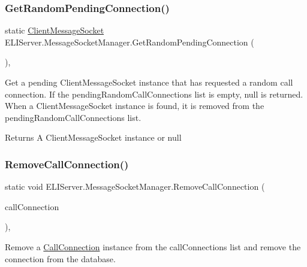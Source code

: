\subsubsection{\texorpdfstring{Get\+Random\+Pending\+Connection()}{GetRandomPendingConnection()}}
{\footnotesize\ttfamily static \hyperlink{class_e_l_i_server_1_1_messaging_1_1_client_message_socket}{Client\+Message\+Socket} E\+L\+I\+Server.\+Message\+Socket\+Manager.\+Get\+Random\+Pending\+Connection (\begin{DoxyParamCaption}{ }\end{DoxyParamCaption})\hspace{0.3cm}{\ttfamily [inline]}, {\ttfamily [static]}}



Get a pending Client\+Message\+Socket instance that has requested a random call connection. If the pending\+Random\+Call\+Connections list is empty, null is returned. When a Client\+Message\+Socket instance is found, it is removed from the pending\+Random\+Call\+Connections list. 

\begin{DoxyReturn}{Returns}
A Client\+Message\+Socket instance or null
\end{DoxyReturn}
\mbox{\label{class_e_l_i_server_1_1_message_socket_manager_af591d88e97afd289dfd4f2d89713f5b2}} 
\subsubsection{\texorpdfstring{Remove\+Call\+Connection()}{RemoveCallConnection()}}
{\footnotesize\ttfamily static void E\+L\+I\+Server.\+Message\+Socket\+Manager.\+Remove\+Call\+Connection (\begin{DoxyParamCaption}\item[{\hyperlink{class_e_l_i_server_1_1_call_connection}{Call\+Connection}}]{call\+Connection }\end{DoxyParamCaption})\hspace{0.3cm}{\ttfamily [inline]}, {\ttfamily [static]}}



Remove a \hyperlink{class_e_l_i_server_1_1_call_connection}{Call\+Connection} instance from the call\+Connections list and remove the connection from the database. 


